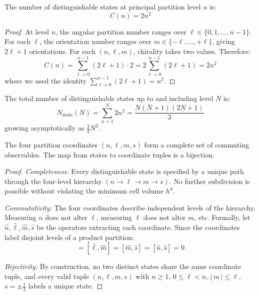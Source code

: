 \begin{theorem}
\label{thm:capacity}
The number of distinguishable states at principal partition level $n$ is:
\begin{equation}
    C(n) = 2n^2
\end{equation}
\end{theorem}

\begin{proof}
At level $n$, the angular partition number ranges over $\ell \in \{0, 1, \ldots, n-1\}$. For each $\ell$, the orientation number ranges over $m \in \{-\ell, \ldots, +\ell\}$, giving $2\ell + 1$ orientations. For each $(n, \ell, m)$, chirality takes two values. Therefore:
\begin{equation}
    C(n) = \sum_{\ell=0}^{n-1} (2\ell + 1) \cdot 2 = 2 \sum_{\ell=0}^{n-1} (2\ell + 1) = 2n^2
\end{equation}
where we used the identity $\sum_{\ell=0}^{n-1}(2\ell+1) = n^2$.
\end{proof}

\begin{corollary}
\label{cor:cumulative}
The total number of distinguishable states up to and including level $N$ is:
\begin{equation}
    N_{\mathrm{state}}(N) = \sum_{n=1}^{N} 2n^2 = \frac{N(N+1)(2N+1)}{3}
\end{equation}
growing asymptotically as $\tfrac{2}{3}N^3$.
\end{corollary}

\begin{theorem}
\label{thm:completeness}
The four partition coordinates $(n, \ell, m, s)$ form a complete set of commuting observables. The map from states to coordinate tuples is a bijection.
\end{theorem}

\begin{proof}
\emph{Completeness:} Every distinguishable state is specified by a unique path through the four-level hierarchy $(n \to \ell \to m \to s)$. No further subdivision is possible without violating the minimum cell volume $h^d$.

\emph{Commutativity:} The four coordinates describe independent levels of the hierarchy. Measuring $n$ does not alter $\ell$, measuring $\ell$ does not alter $m$, etc. Formally, let $\hat{n}, \hat{\ell}, \hat{m}, \hat{s}$ be the operators extracting each coordinate. Since the coordinates label disjoint levels of a product partition:
\begin{equation}
    [\hat{n}, \hat{\ell}] = [\hat{\ell}, \hat{m}] = [\hat{m}, \hat{s}] = [\hat{n}, \hat{s}] = 0
\end{equation}

\emph{Bijectivity:} By construction, no two distinct states share the same coordinate tuple, and every valid tuple $(n, \ell, m, s)$ with $n \geq 1$, $0 \leq \ell < n$, $|\,m\,| \leq \ell$, $s = \pm \tfrac{1}{2}$ labels a unique state.
\end{proof}

